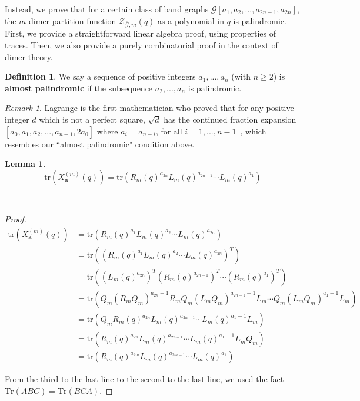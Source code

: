 \documentclass[11pt]{amsart}
\newtheorem{lem}[thm]{Lemma}
\theoremstyle{definition}
\newtheorem{defn}[thm]{Definition}
\theoremstyle{remark}
\newtheorem{rem}[thm]{Remark}
\numberwithin{equation}{section}
\begin{document}
Instead, we prove that for a certain class of band graphs $\overline{\mathcal{G}}[a_1,a_2,...,a_{2n-1},a_{2n}]$, the $m$-dimer partition function $\overline{\mathcal{Z}}_{\overline{\mathcal{G}},m}(q)$ as a polynomial in $q$ is palindromic. First, we provide a straightforward linear algebra proof, using properties of traces. Then, we also provide a purely combinatorial proof in the context of dimer theory. 

\begin{defn}
    We say a sequence of positive integers $a_1,...,a_n$ (with $n\geq 2$) is \textbf{almost palindromic} if the subsequence $a_2,...,a_n$ is palindromic.  
\end{defn}

\begin{rem}
    Lagrange is the first mathematician who proved that for any positive integer $d$ which is not a perfect square, $\sqrt{d}$ has the continued fraction expansion $[a_0,\overline{a_1,a_2,...,a_{n-1},2a_0}]$ where $a_i = a_{n-i}$, for all $i=1,...,n-1$~\cite{widz09}, which resembles our ``almost palindromic" condition above.
\end{rem}
\begin{lem}\label{lem: reverse_word}
    \[\text{tr}(X^{(m)}_{\mathbf{a}}(q))=\text{tr}(R_m(q)^{a_{2n}}L_m(q)^{a_{2n-1}}\cdots L_m(q)^{a_1})\]
\end{lem}\
\begin{proof}
    \begin{align*}
        \text{tr}(X^{(m)}_{\mathbf{a}}(q))&=\text{tr}(R_m(q)^{a_1}L_m(q)^{a_2}\cdots L_m(q)^{a_{2n}})\\
        &=\text{tr}((R_m(q)^{a_1}L_m(q)^{a_2}\cdots L_m(q)^{a_{2n}})^T)\\
        &=\text{tr}((L_m(q)^{a_{2n}})^T(R_m(q)^{a_{2n-1}})^T\cdots (R_m(q)^{a_1})^T)\\
        &=\text{tr}(Q_m(R_mQ_m)^{a_{2n}-1}R_mQ_m(L_mQ_m)^{a_{2n-1}-1}L_m\cdots Q_m(L_mQ_m)^{a_1-1}L_m)\\
        &=\text{tr}(Q_mR_m(q)^{a_{2n}}L_m(q)^{a_{2n-1}}\cdots L_m(q)^{a_1-1}L_m)\\
        &=\text{tr}(R_m(q)^{a_{2n}}L_m(q)^{a_{2n-1}}\cdots L_m(q)^{a_1-1}L_mQ_m)\\
        &=\text{tr}(R_m(q)^{a_{2m}}L_m(q)^{a_{2m-1}}\cdots L_m(q)^{a_1})
    \end{align*}

From the third to the last line to the second to the last line, we used the fact $\text{Tr}(ABC)=\text{Tr}(BCA)$.
\end{proof}
\end{document}
